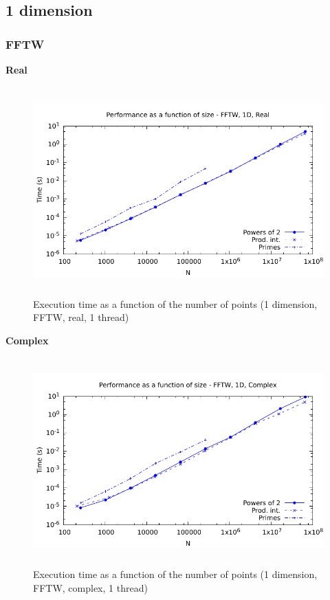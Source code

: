\documentclass[12pt, a4paper]{article}
\begin{document}
\subsection{1 dimension}
\subsubsection{FFTW}
{\bf Real}
\begin{figure}[H]
\captionsetup{width=0.6\textwidth}
\centering
\includegraphics[height=8cm]{graphs/performance/1d-fftw-r.pdf}
\caption{Execution time as a function of the number of points (1 dimension, FFTW, real, 1 thread)}
\label{1DFFTWR}
\end{figure}
{\bf Complex}
\begin{figure}[H]
\captionsetup{width=0.6\textwidth}
\centering
\includegraphics[height=8cm]{graphs/performance/1d-fftw-c.pdf}
\caption{Execution time as a function of the number of points (1 dimension, FFTW, complex, 1 thread)}
\label{1DFFTWC}
\end{figure}   
\end{document}
